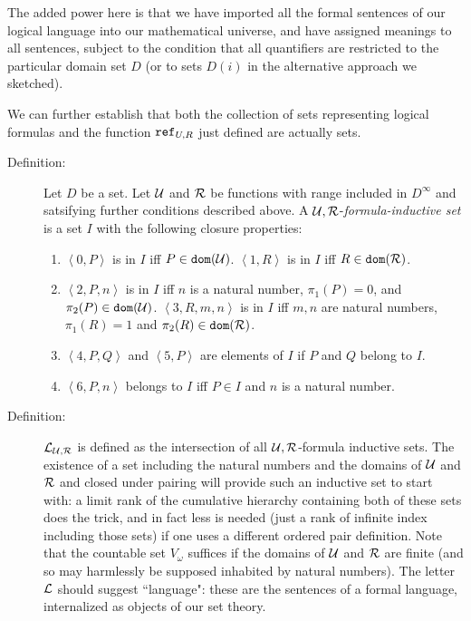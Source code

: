 \documentclass[12pt]{book}
\begin{document}
The added power here is that we have imported all the formal sentences of our logical language into our mathematical universe, and have assigned meanings to all sentences, subject to the condition that all quantifiers are restricted to the particular domain set $D$ (or to sets $D(i)$ in the alternative approach we sketched).

We can further establish that both the collection of sets representing logical formulas and the function ${\tt ref}_{U,R}$ just defined are actually sets.

\begin{description}

\item[Definition:]  Let $D$ be a set.  Let $\cal U$ and $\cal R$ be functions with range included in $D^{\infty}$ and satsifying further conditions described above.  A $\cal U,R$-{\em formula-inductive set\/} is a set $I$ with the following closure properties:

\begin{enumerate}

\item $\left<0,P\right>$ is in $I$ iff $P \in {\tt dom}(\cal U)$.  $\left<1,R\right>$ is in $I$ iff $R \in {\tt dom}(\cal R)$.

\item  $\left<2,P,n\right>$ is in $I$ iff $n$ is a natural number, $\pi_1(P)=0$, and $\pi_2(P) \in {\tt dom}(\cal U)$.  $\left<3,R,m,n\right>$ is in $I$ iff $m,n$ are natural numbers,
$\pi_1(R) = 1$ and $\pi_2(R) \in {\tt dom}(\cal R)$.

\item $\left<4,P,Q\right>$ and $\left<5,P\right>$ are elements of $I$ if $P$ and $Q$ belong to $I$.

\item $\left<6,P,n\right>$ belongs to $I$ iff $P \in I$ and $n$ is a natural number.


\end{enumerate}

\item[Definition:]  ${\cal L}_{\cal U,R}$ is defined as the intersection of all $\cal U,R$-formula inductive sets.  The existence of a set including the natural numbers and the domains of $\cal U$ and $\cal R$ and closed under pairing will provide such an inductive set to start with:  a limit rank of the cumulative hierarchy containing both of these sets does the trick, and in fact less is needed (just a rank of infinite index including those sets)  if one uses a different ordered pair definition.  Note that the countable set $V_{\omega}$ suffices if the domains of $\cal U$ and $\cal R$ are finite (and so may harmlessly be supposed inhabited by natural numbers).   The letter $\cal L$ should suggest ``language":  these are the sentences of a formal language, internalized as objects of our set theory.


\end{description}
\end{document}
